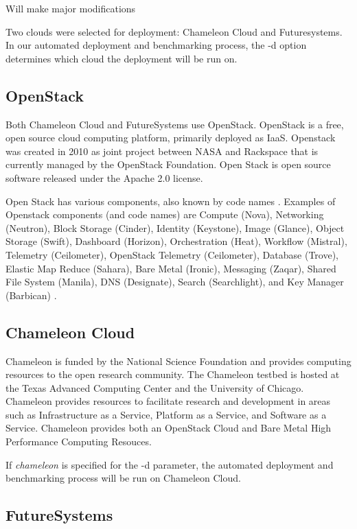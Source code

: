 \documentclass[9pt,twocolumn,twoside]{../../styles/osajnl}
\begin{document}
Will make major modifications

Two clouds were selected for deployment: Chameleon Cloud and Futuresystems.  In our automated deployment and benchmarking process, the -d option determines which cloud the deployment will be run on.

\subsection{OpenStack}

Both Chameleon Cloud and FutureSystems use OpenStack.  OpenStack is a free, open source cloud computing platform, primarily deployed as IaaS.  \cite{www-wikiOpenStack}  Openstack was created in 2010 as joint project between NASA and Rackspace that is currently managed by the OpenStack Foundation.  \cite{www-wikiOpenStack} Open Stack is open source software released under the Apache 2.0 license.  \cite{www-openStackFAQ}

Open Stack has various components, also known by code names \cite{www-wikiOpenStack}.  Examples of Openstack components (and code names) are Compute (Nova), Networking (Neutron), Block Storage (Cinder), Identity (Keystone), Image (Glance), Object Storage (Swift), Dashboard (Horizon), Orchestration (Heat), Workflow (Mistral), Telemetry (Ceilometer), OpenStack Telemetry (Ceilometer), Database (Trove), Elastic Map Reduce (Sahara), Bare Metal (Ironic), Messaging (Zaqar), Shared File System (Manila), DNS (Designate), Search (Searchlight), and Key Manager (Barbican) \cite{www-wikiOpenStack}.

\subsection{Chameleon Cloud}

Chameleon is funded by the National Science Foundation and provides computing resources to the open research community.  The Chameleon testbed is hosted at the Texas Advanced Computing Center and the University of Chicago. Chameleon provides resources to facilitate research and development in areas such as Infrastructure as a Service, Platform as a Service, and Software as a Service.  Chameleon provides both an OpenStack Cloud and Bare Metal High Performance Computing Resouces. \cite{www-chamAbout}

If \emph{chameleon} is specified for the -d parameter, the automated deployment and benchmarking process will be run on Chameleon Cloud.

\subsection{FutureSystems}
\end{document}
